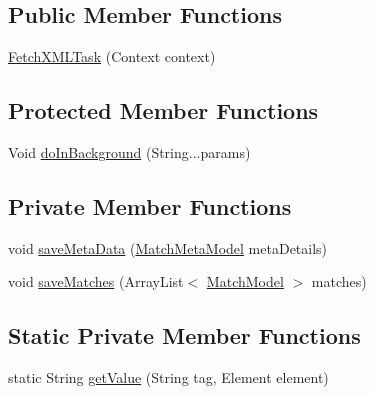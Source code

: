 \subsection*{Public Member Functions}
\begin{DoxyCompactItemize}
\item 
\hyperlink{classorg_1_1buildmlearn_1_1toolkit_1_1matchtemplate_1_1data_1_1FetchXMLTask_a43f4d347f52661e3e463519d97e28651}{Fetch\+X\+M\+L\+Task} (Context context)
\end{DoxyCompactItemize}
\subsection*{Protected Member Functions}
\begin{DoxyCompactItemize}
\item 
Void \hyperlink{classorg_1_1buildmlearn_1_1toolkit_1_1matchtemplate_1_1data_1_1FetchXMLTask_af6bc6ac11bccdef99845339bb4525519}{do\+In\+Background} (String...\+params)
\end{DoxyCompactItemize}
\subsection*{Private Member Functions}
\begin{DoxyCompactItemize}
\item 
void \hyperlink{classorg_1_1buildmlearn_1_1toolkit_1_1matchtemplate_1_1data_1_1FetchXMLTask_ae05a98080b1677e88b79a3cb54ea1e9d}{save\+Meta\+Data} (\hyperlink{classorg_1_1buildmlearn_1_1toolkit_1_1matchtemplate_1_1data_1_1MatchMetaModel}{Match\+Meta\+Model} meta\+Details)
\item 
void \hyperlink{classorg_1_1buildmlearn_1_1toolkit_1_1matchtemplate_1_1data_1_1FetchXMLTask_a7ce35650d5a6ec47124dd5b663e75ab9}{save\+Matches} (Array\+List$<$ \hyperlink{classorg_1_1buildmlearn_1_1toolkit_1_1matchtemplate_1_1data_1_1MatchModel}{Match\+Model} $>$ matches)
\end{DoxyCompactItemize}
\subsection*{Static Private Member Functions}
\begin{DoxyCompactItemize}
\item 
static String \hyperlink{classorg_1_1buildmlearn_1_1toolkit_1_1matchtemplate_1_1data_1_1FetchXMLTask_abfeadc8516cb46567857b30b835f641f}{get\+Value} (String tag, Element element)
\end{DoxyCompactItemize}
